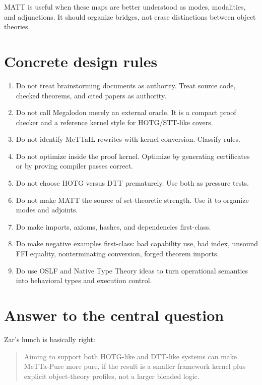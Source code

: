 \documentclass[11pt]{article}
\newcommand{\MeTTa}{\textup{MeTTa}}
\newcommand{\MeTTaIL}{\textup{MeTTaIL}}
\newcommand{\HOTG}{\textup{HOTG}}
\newcommand{\DTT}{\textup{DTT}}
\newcommand{\MATT}{\textup{MATT}}
\newcommand{\OSLF}{\textup{OSLF}}
\begin{document}
\MATT{} is useful when these maps are better understood as modes, modalities, and adjunctions.  It should organize bridges, not erase distinctions between object theories.

\section{Concrete design rules}

\begin{enumerate}
\item Do not treat brainstorming documents as authority.  Treat source code, checked theorems, and cited papers as authority.
\item Do not call Megalodon merely an external oracle.  It is a compact proof checker and a reference kernel style for HOTG/STT-like covers.
\item Do not identify \MeTTaIL{} rewrites with kernel conversion.  Classify rules.
\item Do not optimize inside the proof kernel.  Optimize by generating certificates or by proving compiler passes correct.
\item Do not choose \HOTG{} versus \DTT{} prematurely.  Use both as pressure tests.
\item Do not make \MATT{} the source of set-theoretic strength.  Use it to organize modes and adjoints.
\item Do make imports, axioms, hashes, and dependencies first-class.
\item Do make negative examples first-class: bad capability use, bad index, unsound FFI equality, nonterminating conversion, forged theorem imports.
\item Do use \OSLF{} and Native Type Theory ideas to turn operational semantics into behavioral types and execution control.
\end{enumerate}

\section{Answer to the central question}

Zar's hunch is basically right:

\begin{quote}
Aiming to support both \HOTG{}-like and \DTT{}-like systems can make \MeTTa-Pure more pure, if the result is a smaller framework kernel plus explicit object-theory profiles, not a larger blended logic.
\end{quote}
\end{document}
